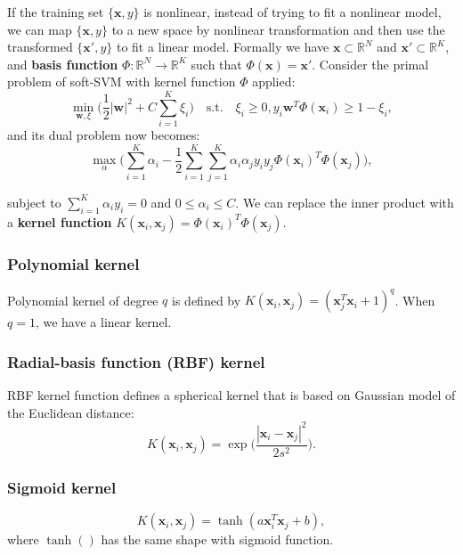 \documentclass[../main.tex]{subfiles}
\begin{document}
\setlength{\parindent}{0pt}
If the training set $\{\textbf{x}, y\}$ is nonlinear, instead of trying to fit a nonlinear model, we can map $\{\textbf{x}, y\}$ to a new space by nonlinear transformation and then use the transformed $\{\textbf{x}', y\}$ to fit a linear model. Formally we have $\textbf{x}\subset \mathbb{R}^N$ and $\textbf{x}'\subset \mathbb{R}^K$, and \textbf{basis function} $\Phi: \mathbb{R}^N\to \mathbb{R}^K$ such that $\Phi(\textbf{x})=\textbf{x}'$. Consider the primal problem of soft-SVM with kernel function $\Phi$ applied: $$\min_{\textbf{w}, \xi}\big( \frac{1}{2}|\textbf{w}|^2+C\sum_{i=1}^K\xi_i \big) \quad \text{s.t.} \quad \xi_i\geq 0, y_i\textbf{w}^T\Phi(\textbf{x}_i)\geq 1-\xi_i,$$ and its dual problem now becomes: $$\max_{\alpha}\bigg(\sum_{i=1}^K \alpha_i-\frac{1}{2}\sum_{i=1}^K\sum_{j=1}^K\alpha_i\alpha_j y_i y_j \Phi(\textbf{x}_i)^T\Phi(\textbf{x}_j)\bigg),$$

subject to $\sum_{i=1}^K\alpha_iy_i=0$ and $0 \leq \alpha_i \leq C$. We can replace the inner product with a \textbf{kernel function} $K(\textbf{x}_i, \textbf{x}_j)=\Phi(\textbf{x}_i)^T\Phi(\textbf{x}_j)$.

\subsubsection{Polynomial kernel}
Polynomial kernel of degree $q$ is defined by $K(\textbf{x}_i, \textbf{x}_j)=(\textbf{x}_j^T\textbf{x}_i+1)^q$. When $q=1$, we have a linear kernel.

\subsubsection{Radial-basis function (RBF) kernel}
RBF kernel function defines a spherical kernel that is based on Gaussian model of the Euclidean distance: $$K(\textbf{x}_i, \textbf{x}_j)=\exp{\bigg( \frac{|\textbf{x}_i-\textbf{x}_j|^2}{2s^2} \bigg)}.$$

\subsubsection{Sigmoid kernel}
$$K(\textbf{x}_i, \textbf{x}_j)=\tanh{(a\textbf{x}_i^T\textbf{x}_j+b)},$$
where $\tanh{()}$ has the same shape with sigmoid function.
\end{document}

